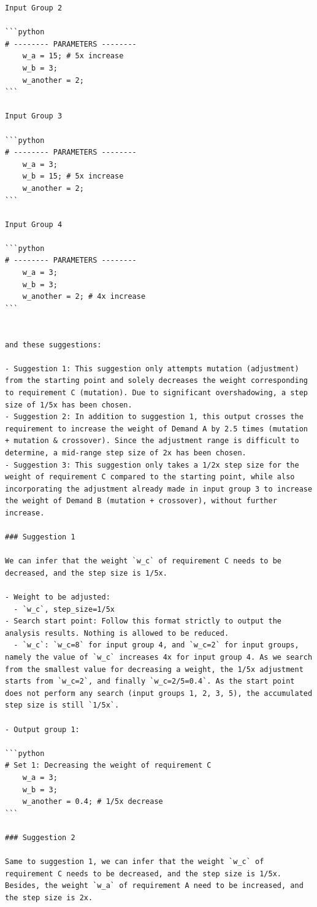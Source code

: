 \documentclass{article}
\begin{document}
\begin{verbatim}
Input Group 2

```python
# -------- PARAMETERS --------
    w_a = 15; # 5x increase
    w_b = 3;
    w_another = 2;
```

Input Group 3

```python
# -------- PARAMETERS --------
    w_a = 3;
    w_b = 15; # 5x increase
    w_another = 2;
```

Input Group 4

```python
# -------- PARAMETERS --------
    w_a = 3;
    w_b = 3;
    w_another = 2; # 4x increase
```


and these suggestions:

- Suggestion 1: This suggestion only attempts mutation (adjustment) from the starting point and solely decreases the weight corresponding to requirement C (mutation). Due to significant overshadowing, a step size of 1/5x has been chosen.
- Suggestion 2: In addition to suggestion 1, this output crosses the requirement to increase the weight of Demand A by 2.5 times (mutation + mutation & crossover). Since the adjustment range is difficult to determine, a mid-range step size of 2x has been chosen.
- Suggestion 3: This suggestion only takes a 1/2x step size for the weight of requirement C compared to the starting point, while also incorporating the adjustment already made in input group 3 to increase the weight of Demand B (mutation + crossover), without further increase.

### Suggestion 1

We can infer that the weight `w_c` of requirement C needs to be decreased, and the step size is 1/5x.

- Weight to be adjusted:
  - `w_c`, step_size=1/5x
- Search start point: Follow this format strictly to output the analysis results. Nothing is allowed to be reduced.
  - `w_c`: `w_c=8` for input group 4, and `w_c=2` for input groups, namely the value of `w_c` increases 4x for input group 4. As we search from the smallest value for decreasing a weight, the 1/5x adjustment starts from `w_c=2`, and finally `w_c=2/5=0.4`. As the start point does not perform any search (input groups 1, 2, 3, 5), the accumulated step size is still `1/5x`.

- Output group 1:

```python
# Set 1: Decreasing the weight of requirement C
	w_a = 3;
    w_b = 3;
    w_another = 0.4; # 1/5x decrease
```

### Suggestion 2

Same to suggestion 1, we can infer that the weight `w_c` of requirement C needs to be decreased, and the step size is 1/5x. Besides, the weight `w_a` of requirement A need to be increased, and the step size is 2x. 


\end{verbatim}
\end{document}
